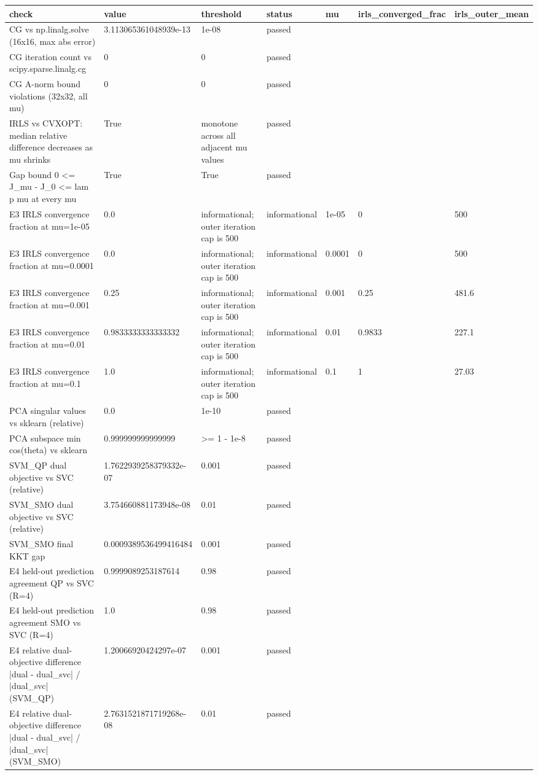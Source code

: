 \begin{tabular}{lllllll}
\hline
check & value & threshold & status & mu & irls\_converged\_frac & irls\_outer\_mean \\
\hline
CG vs np.linalg.solve (16x16, max abs error) & 3.113065361048939e-13 & 1e-08 & passed &  &  &  \\
CG iteration count vs scipy.sparse.linalg.cg & 0 & 0 & passed &  &  &  \\
CG A-norm bound violations (32x32, all mu) & 0 & 0 & passed &  &  &  \\
IRLS vs CVXOPT: median relative difference decreases as mu shrinks & True & monotone across all adjacent mu values & passed &  &  &  \\
Gap bound 0 <= J\_mu - J\_0 <= lam p mu at every mu & True & True & passed &  &  &  \\
E3 IRLS convergence fraction at mu=1e-05 & 0.0 & informational; outer iteration cap is 500 & informational & 1e-05 & 0 & 500 \\
E3 IRLS convergence fraction at mu=0.0001 & 0.0 & informational; outer iteration cap is 500 & informational & 0.0001 & 0 & 500 \\
E3 IRLS convergence fraction at mu=0.001 & 0.25 & informational; outer iteration cap is 500 & informational & 0.001 & 0.25 & 481.6 \\
E3 IRLS convergence fraction at mu=0.01 & 0.9833333333333332 & informational; outer iteration cap is 500 & informational & 0.01 & 0.9833 & 227.1 \\
E3 IRLS convergence fraction at mu=0.1 & 1.0 & informational; outer iteration cap is 500 & informational & 0.1 & 1 & 27.03 \\
PCA singular values vs sklearn (relative) & 0.0 & 1e-10 & passed &  &  &  \\
PCA subspace min cos(theta) vs sklearn & 0.999999999999999 & >= 1 - 1e-8 & passed &  &  &  \\
SVM\_QP dual objective vs SVC (relative) & 1.7622939258379332e-07 & 0.001 & passed &  &  &  \\
SVM\_SMO dual objective vs SVC (relative) & 3.754660881173948e-08 & 0.01 & passed &  &  &  \\
SVM\_SMO final KKT gap & 0.0009389536499416484 & 0.001 & passed &  &  &  \\
E4 held-out prediction agreement QP vs SVC (R=4) & 0.9999089253187614 & 0.98 & passed &  &  &  \\
E4 held-out prediction agreement SMO vs SVC (R=4) & 1.0 & 0.98 & passed &  &  &  \\
E4 relative dual-objective difference |dual - dual\_svc| / |dual\_svc| (SVM\_QP) & 1.20066920424297e-07 & 0.001 & passed &  &  &  \\
E4 relative dual-objective difference |dual - dual\_svc| / |dual\_svc| (SVM\_SMO) & 2.7631521871719268e-08 & 0.01 & passed &  &  &  \\
\hline
\end{tabular}
